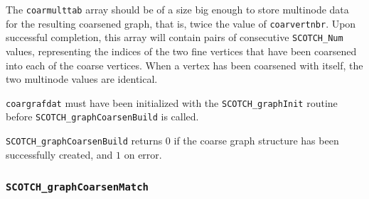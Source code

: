 \begin{itemize}
The {\tt coarmulttab} array should be of a size big enough to store
multinode data for the resulting coarsened graph, that is, twice the
value of {\tt coar\lbt vert\lbt nbr}. Upon successful completion,
this array will contain pairs of consecutive {\tt SCOTCH\_\lbt Num}
values, representing the indices of the two fine vertices that have
been coarsened into each of the coarse vertices. When a vertex has
been coarsened with itself, the two multinode values are identical.

{\tt coargrafdat} must have been initialized with the
{\tt SCOTCH\_\lbt graph\lbt Init} routine before
{\tt SCOTCH\_graph\lbt Coarsen\lbt Build} is called.

\progret

{\tt SCOTCH\_graphCoarsenBuild} returns $0$ if the coarse graph
structure has been successfully created, and $1$ on error.
\end{itemize}

\subsubsection{{\tt SCOTCH\_graphCoarsenMatch}}


